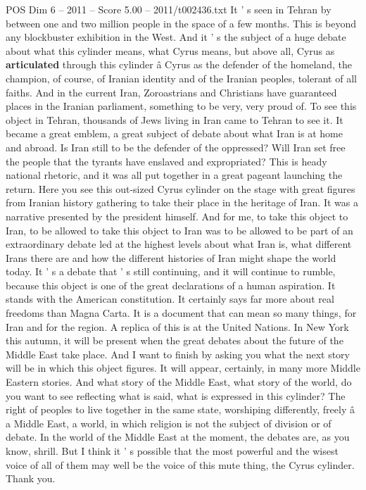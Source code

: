 \begin{textsample}{POS Dim 6 – 2011 – Score 5.00 – 2011/t002436.txt}
It ' s seen in Tehran by between one and two million people in the space of a few months.
This is beyond any blockbuster exhibition in the West.
And it ' s the subject of a huge debate about what this cylinder means, what Cyrus means, but above all, Cyrus as \textbf{articulated} through this cylinder â Cyrus as the defender of the homeland, the champion, of course, of Iranian identity and of the Iranian peoples, tolerant of all faiths.
And in the current Iran, Zoroastrians and Christians have guaranteed places in the Iranian parliament, something to be very, very proud of.
To see this object in Tehran, thousands of Jews living in Iran came to Tehran to see it.
It became a great emblem, a great subject of debate about what Iran is at home and abroad.
Is Iran still to be the defender of the oppressed?
Will Iran set free the people that the tyrants have enslaved and expropriated?
This is heady national rhetoric, and it was all put together in a great pageant launching the return.
Here you see this out-sized Cyrus cylinder on the stage with great figures from Iranian history gathering to take their place in the heritage of Iran.
It was a narrative presented by the president himself.
And for me, to take this object to Iran, to be allowed to take this object to Iran was to be allowed to be part of an extraordinary debate led at the highest levels about what Iran is, what different Irans there are and how the different histories of Iran might shape the world today.
It ' s a debate that ' s still continuing, and it will continue to rumble, because this object is one of the great declarations of a human aspiration.
It stands with the American constitution.
It certainly says far more about real freedoms than Magna Carta.
It is a document that can mean so many things, for Iran and for the region.
A replica of this is at the United Nations.
In New York this autumn, it will be present when the great debates about the future of the Middle East take place.
And I want to finish by asking you what the next story will be in which this object figures.
It will appear, certainly, in many more Middle Eastern stories.
And what story of the Middle East, what story of the world, do you want to see reflecting what is said, what is expressed in this cylinder?
The right of peoples to live together in the same state, worshiping differently, freely â a Middle East, a world, in which religion is not the subject of division or of debate.
In the world of the Middle East at the moment, the debates are, as you know, shrill.
But I think it ' s possible that the most powerful and the wisest voice of all of them may well be the voice of this mute thing, the Cyrus cylinder.
Thank you.

\end{textsample}
